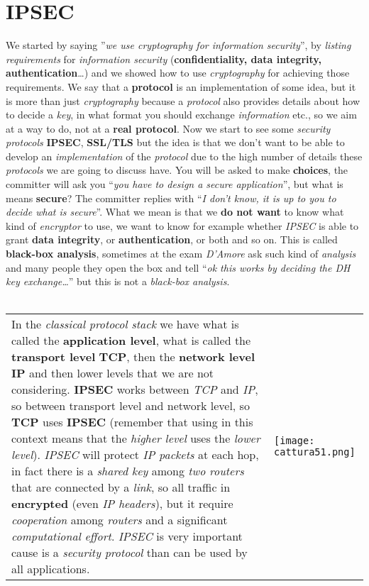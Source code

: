 \documentclass{article}
\begin{document}
\section{IPSEC}
We started by saying ''\emph{we use cryptography for information security}'', by \emph{listing requirements} for \emph{information security} (\textbf{confidentiality, data integrity, authentication}…) and we showed how to use \emph{cryptography} for achieving those requirements. We say that a \textbf{protocol} is an implementation of some idea, but it is more than just \emph{cryptography} because a \emph{protocol} also provides details about how to decide a \emph{key}, in what format you should exchange \emph{information} etc., so we aim at a way to do, not at a \textbf{real protocol}. Now we start to see some \emph{security protocols} \textbf{IPSEC}, \textbf{SSL/TLS} but the idea is that we don't want to be able to develop an \emph{implementation} of the \emph{protocol} due to the high number of details these \emph{protocols} we are going to discuss have. You will be asked to make \textbf{choices}, the committer will ask you “\emph{you have to design a secure application}”, but what is means \textbf{secure}? The committer replies with “\emph{I don’t know, it is up to you to decide what is secure}”. What we mean is that we\textbf{ do not want} to know what kind of \emph{encryptor} to use, we want to know for example whether \emph{IPSEC} is able to grant \textbf{data integrity}, or \textbf{authentication}, or both and so on. This is called \textbf{black-box analysis}, sometimes at the exam \emph{D'Amore} ask such kind of \emph{analysis} and many people they open the box and tell “\emph{ok this works by deciding the DH key exchange…}” but this is not a \emph{black-box analysis}. \\\\
\begin{tabular}{C{11cm}  L{10.5cm}}
In the \emph{classical protocol stack} we have what is called the \textbf{application level}, what is called the \textbf{transport level} \textbf{TCP}, then the \textbf{network level} \textbf{IP} and then lower levels that we are not considering. \textbf{IPSEC} works between \emph{TCP} and \emph{IP}, so between transport level and network level, so \textbf{TCP} uses \textbf{IPSEC} (remember that using in this context means that the \emph{higher level} uses the \emph{lower level}). \emph{IPSEC} will protect \emph{IP packets} at each hop, in fact there is a \emph{shared key} among \emph{two routers} that are connected by a \emph{link}, so all traffic in \textbf{encrypted} (even \emph{IP headers}), but it require \emph{cooperation} among \emph{routers} and a significant \emph{computational effort}. \emph{IPSEC} is very important cause is a \emph{security protocol} than can be used by all applications. 
& \texttt{[image: cattura51.png]}
\end{tabular} 
\end{document}
